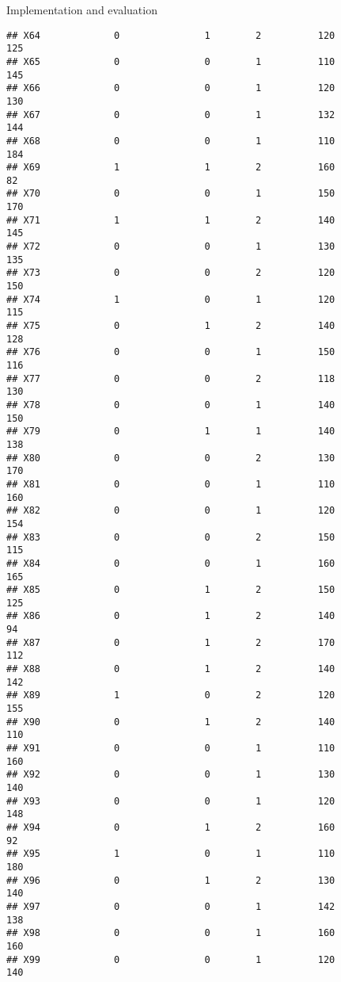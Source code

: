 \documentclass[
  ignorenonframetext,
]{beamer}
\begin{document}
\begin{frame}[fragile]{Implementation and evaluation}
\begin{verbatim}
## X64             0               1        2          120            125
## X65             0               0        1          110            145
## X66             0               0        1          120            130
## X67             0               0        1          132            144
## X68             0               0        1          110            184
## X69             1               1        2          160             82
## X70             0               0        1          150            170
## X71             1               1        2          140            145
## X72             0               0        1          130            135
## X73             0               0        2          120            150
## X74             1               0        1          120            115
## X75             0               1        2          140            128
## X76             0               0        1          150            116
## X77             0               0        2          118            130
## X78             0               0        1          140            150
## X79             0               1        1          140            138
## X80             0               0        2          130            170
## X81             0               0        1          110            160
## X82             0               0        1          120            154
## X83             0               0        2          150            115
## X84             0               0        1          160            165
## X85             0               1        2          150            125
## X86             0               1        2          140             94
## X87             0               1        2          170            112
## X88             0               1        2          140            142
## X89             1               0        2          120            155
## X90             0               1        2          140            110
## X91             0               0        1          110            160
## X92             0               0        1          130            140
## X93             0               0        1          120            148
## X94             0               1        2          160             92
## X95             1               0        1          110            180
## X96             0               1        2          130            140
## X97             0               0        1          142            138
## X98             0               0        1          160            160
## X99             0               0        1          120            140

\end{verbatim}
\end{frame}
\end{document}
